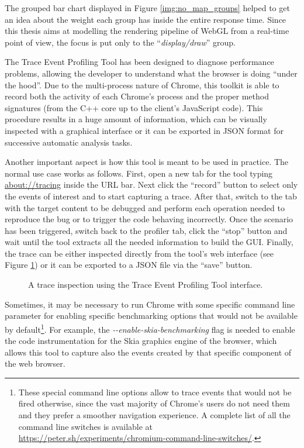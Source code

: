 The grouped bar chart displayed in Figure \ref{img:no_map_groups} helped to
get an idea about the weight each group has inside the entire response time.
Since this thesis aims at modelling the rendering pipeline of WebGL from a real-time
point of view, the focus is put only to the ``\emph{display/draw}'' group.

The Trace Event Profiling Tool has been designed to diagnose performance problems,
allowing the developer to understand what the browser is doing ``under the hood''.
Due to the multi-process nature of Chrome, this toolkit is able to record
both the activity of each Chrome's process and the proper method signatures
(from the C++ core up to the client's JavaScript code). This procedure results in
a huge amount of information, which can be visually inspected with a graphical
interface or it can be exported in JSON format for successive automatic analysis
tasks.

Another important aspect is how this tool is meant to be used in practice. The normal use case
works as follows. First, open a new tab for the tool typing \url{about://tracing}
inside the URL bar.
Next click the ``record'' button to select only the events of interest and to
start capturing a trace. After that, switch to the tab with the target content
to be debugged and perform each operation needed to reproduce the bug or to trigger
the code behaving incorrectly. Once the scenario has been triggered, switch back to the profiler
tab, click the ``stop'' button and wait until the tool extracts all the needed
information to build the GUI. Finally, the trace can be either inspected directly
from the tool's web interface (see Figure \ref{img:chrome_profiler}) or it can be
exported to a JSON file via the ``save'' button.
\begin{figure}[!htb]
    \caption{A trace inspection using the Trace Event Profiling Tool interface.}
    \label{img:chrome_profiler}
\end{figure}

Sometimes, it may be necessary to run Chrome with some specific command
line parameter for enabling specific benchmarking options that would not be
available by default\footnote{These special command line options allow to trace
events that would not be fired otherwise, since the vast majority of Chrome's
users do not need them and they prefer a smoother navigation experience. A complete
list of all the command line switches is available at
\url{https://peter.sh/experiments/chromium-command-line-switches/}.}.
For example, the \emph{-{}-enable-skia-benchmarking} flag is needed to enable the
code instrumentation for the Skia graphics engine of the browser, which allows
this tool to capture also the events created by that specific
component of the web browser.


